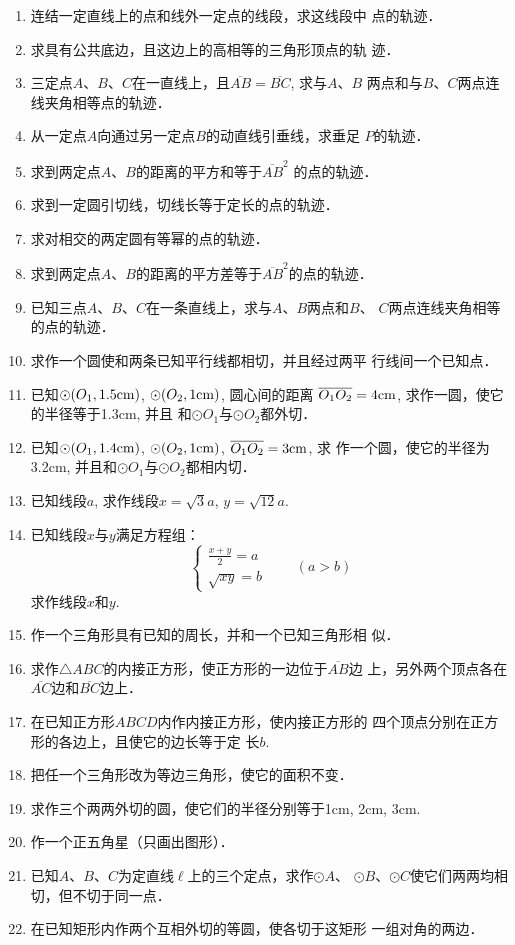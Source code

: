 \begin{enumerate}
    \item 连结一定直线上的点和线外一定点的线段，求这线段中
    点的轨迹．
    \item 求具有公共底边，且这边上的高相等的三角形顶点的轨
    迹．
    \item 三定点$A$、$B$、$C$在一直线上，且$\overline{AB}=\overline{BC}$, 求与$A$、$B$
    两点和与$B$、$C$两点连线夹角相等点的轨迹．
    \item 从一定点$A$向通过另一定点$B$的动直线引垂线，求垂足
    $P$的轨迹．
    \item 求到两定点$A$、$B$的距离的平方和等于$\overline{AB}^2$
    的点的轨迹．
    \item 求到一定圆引切线，切线长等于定长的点的轨迹．
    \item 求对相交的两定圆有等幂的点的轨迹．
    \item 求到两定点$A$、$B$的距离的平方差等于$\overline{AB}^2$的点的轨迹．
    \item 已知三点$A$、$B$、$C$在一条直线上，求与$A$、$B$两点和$B$、
   $ C$两点连线夹角相等的点的轨迹．
    \item 求作一个圆使和两条已知平行线都相切，并且经过两平
    行线间一个已知点．
    \item 已知$\odot(O_1,1.5{\rm cm})$, $\odot(O_2,1{\rm cm})$, 圆心间的距离
    $\overline{O_1O_2}=4{\rm cm}$, 求作一圆，使它的半径等于1.3cm, 并且
    和$\odot O_1$与$\odot O_2$都外切．
    \item 已知$\odot(O_1,1.4{\rm cm})$, $\odot(O_2,1{\rm cm})$, $\overline{O_1O_2}=3{\rm cm}$, 求
    作一个圆，使它的半径为3.2cm, 并且和$\odot O_1$与$\odot O_2$都相内切．
    \item 已知线段$a$, 求作线段$x=\sqrt{3}a$, $y=\sqrt{12}a$.
    \item 已知线段$x$与$y$满足方程组：
    \[\begin{cases}
        \frac{x+y}{2}=a\\
        \sqrt{xy}=b
    \end{cases}\qquad (a>b)\]
    求作线段$x$和$y$. 
    \item 作一个三角形具有已知的周长，并和一个已知三角形相
似．
\item 求作$\triangle ABC$的内接正方形，使正方形的一边位于$\overline{AB}$边
上，另外两个顶点各在$\overline{AC}$边和$\overline{BC}$边上．
\item 在已知正方形$ABCD$内作内接正方形，使内接正方形的
四个顶点分别在正方形的各边上，且使它的边长等于定
长$b$.
\item 把任一个三角形改为等边三角形，使它的面积不变．
\item 求作三个两两外切的圆，使它们的半径分别等于1cm,
 2cm, 3cm.
\item 作一个正五角星（只画出图形）．
\item 已知$A$、$B$、$C$为定直线$\ell$上的三个定点，求作$\odot A$、
$\odot B$、$\odot C$使它们两两均相切，但不切于同一点．
\item 在已知矩形内作两个互相外切的等圆，使各切于这矩形
一组对角的两边．
\end{enumerate}
